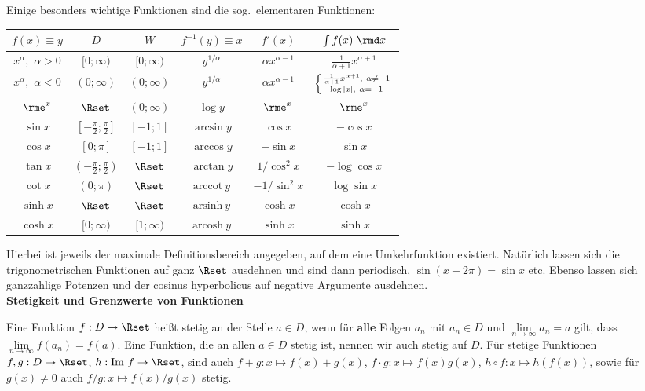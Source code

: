 \documentclass[a4paper,10pt]{article}
\begin{document}
Einige besonders wichtige Funktionen sind die sog.~elementaren Funktionen:
\begin{center}
\begin{tabular}{cccccc}
$f(x)\equiv y$ & $D$ & $W$ & $f^{-1}(y)\equiv x$ & $f'(x)$ & $\int f(x)~\rmd x$ \\\hline
$x^\alpha$,~$\alpha>0$ & $[0;\infty)$ & $[0;\infty)$ & $y^{1/\alpha}$ & $\alpha x^{\alpha-1}$ & $\frac{1}{\alpha+1}x^{\alpha+1} $\\
$x^\alpha$,~$\alpha<0$ & $(0;\infty)$ & $(0;\infty)$ & $y^{1/\alpha}$ & $\alpha x^{\alpha-1}$ & $\left\{{\frac{1}{\alpha+1}x^{\alpha+1},~\alpha\not=-1 \atop \log|x|,~\alpha=-1}\right. $\\
$\rme^x$ & $\Rset$ & $(0;\infty)$ & $\log y$ & $\rme^x$ & $\rme^x$\\
$\sin x$ & $[-\frac{\pi}{2};\frac{\pi}{2}]$ & $[-1;1]$ & $\arcsin y$ & $\cos x$ & $-\cos x$\\
$\cos x$ & $[0;\pi]$ & $[-1;1]$ & $\arccos y$ & $-\sin x$ & $\sin x$\\
$\tan x$ & $(-\frac{\pi}{2};\frac{\pi}{2})$ & $\Rset$ & $\arctan y$ & $1/\cos^2 x$ & $-\log\cos x$\\
$\cot x$ & $(0;\pi)$ & $\Rset$ & $\mathrm{arccot}~y$ & $-1/\sin^2 x$ & $\log\sin x$\\
$\sinh x$ & $\Rset$ & $\Rset$ & $\mathrm{arsinh}~y$ & $\cosh x$ & $\cosh x$\\
$\cosh x$ & $[0;\infty)$ & $[1;\infty)$ & $\mathrm{arcosh}~y$ & $\sinh x$ & $\sinh x$
\end{tabular}
\end{center}
Hierbei ist jeweils der maximale Definitionsbereich angegeben, auf dem
eine Umkehrfunktion existiert. Natürlich lassen sich die trigonometrischen
Funktionen auf ganz $\Rset$ ausdehnen und sind dann periodisch,
$\sin(x+2\pi)=\sin x$ etc. Ebenso lassen sich ganzzahlige Potenzen und
der cosinus hyperbolicus auf negative Argumente ausdehnen.\\

{\bf Stetigkeit und Grenzwerte von Funktionen}

Eine Funktion $f:D\to\Rset$ heißt stetig an der Stelle $a\in D$,
wenn für {\bf alle} Folgen $a_n$ mit $a_n\in D$ und $\lim\limits_{n\to\infty} a_n=a$
gilt, dass $\lim\limits_{n\to\infty} f(a_n)=f(a)$.
Eine Funktion, die an allen $a\in D$ stetig ist, nennen wir auch stetig auf $D$.
Für stetige Funktionen $f,g:D\to\Rset$, $h:\textrm{Im}~f\to\Rset$, sind auch
$f+g:x\mapsto f(x)+g(x)$, $f\cdot g:x\mapsto f(x)g(x)$, $h\circ f:x\mapsto h(f(x))$, sowie für $g(x)\not= 0$ auch $f/g:x\mapsto f(x)/g(x)$ stetig.
\end{document}
